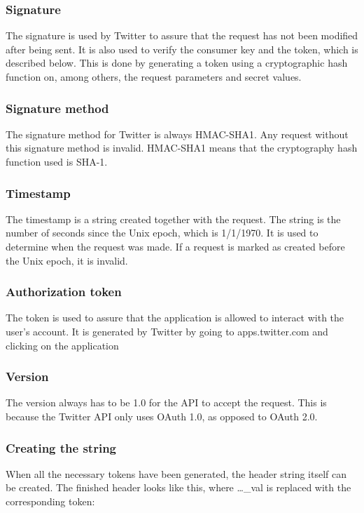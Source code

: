 \subsubsection*{Signature}
The signature is used by Twitter to assure that the request has not been
modified after being sent. It is also used to verify the consumer key and the
token, which is described below.
This is done by generating a token using a cryptographic hash function on, among
others, the request parameters and secret values.

 
\subsubsection*{Signature method}
The signature method for Twitter is always HMAC-SHA1. Any request without this
signature method is invalid. HMAC-SHA1 means that the cryptography hash function
used is \ac{SHA-1}.

\subsubsection*{Timestamp}
The timestamp is a string created together with the request. The string is the
number of seconds since the Unix epoch, which is 1/1/1970. It is used to
determine when the request was made.
If a request is marked as created before the Unix epoch, it is invalid.

\subsubsection*{Authorization token}
The token is used to assure that the application is allowed to
interact with the user's account. It is generated by Twitter by going to
apps.twitter.com and clicking on the application 

\subsubsection*{Version}
The version always has to be 1.0 for the API to accept the
request. This is because the Twitter \ac{API} only uses OAuth 1.0, as opposed to
OAuth 2.0.

\subsubsection{Creating the string}
When all the necessary tokens have been generated, the header string itself can
be created. The finished header looks like this, where \ldots\_val is replaced
with the corresponding token:\nl

